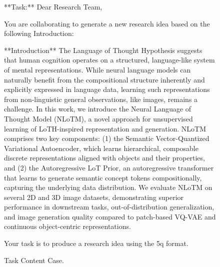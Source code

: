 \begin{figure}[htbp]
\centering
\begin{tcolorbox}[colback=blue!2!white, colframe=gray!50!blue]
\begin{minipage}{\linewidth}
\small
**Task:**
Dear Research Team,

You are collaborating to generate a new research idea based on the following Introduction:

**Introduction**
The Language of Thought Hypothesis suggests that human cognition operates on a structured, language-like system of mental representations. While neural language models can naturally benefit from the compositional structure inherently and explicitly expressed in language data, learning such representations from non-linguistic general observations, like images, remains a challenge. In this work, we introduce the Neural Language of Thought Model (NLoTM), a novel approach for unsupervised learning of LoTH-inspired representation and generation. NLoTM comprises two key components: (1) the Semantic Vector-Quantized Variational Autoencoder, which learns hierarchical, composable discrete representations aligned with objects and their properties, and (2) the Autoregressive LoT Prior, an autoregressive transformer that learns to generate semantic concept tokens compositionally, capturing the underlying data distribution. We evaluate NLoTM on several 2D and 3D image datasets, demonstrating superior performance in downstream tasks, out-of-distribution generalization, and image generation quality compared to patch-based VQ-VAE and continuous object-centric representations.

Your task is to produce a research idea using the 5q format.
\end{minipage}
\end{tcolorbox}
\caption{Task Content Case.}
\label{fig:task-content-case}
\end{figure}

